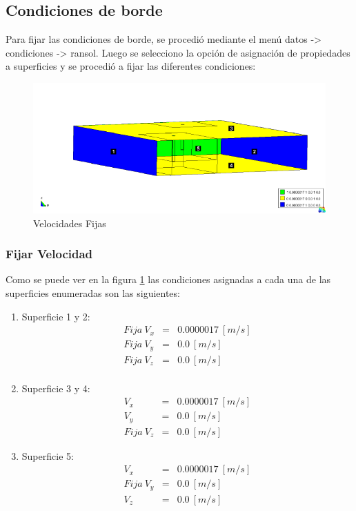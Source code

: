 \documentclass[10pt,a4paper,final]{article}
\begin{document}
%
\subsection{Condiciones de borde}
Para fijar las condiciones de borde, se procedió mediante el menú datos -> condiciones -> ransol. Luego se selecciono la opción de asignación de propiedades a superficies y se procedió a fijar las diferentes condiciones:
\begin{figure}[tbhp]
\centerline{\includegraphics[scale=0.75]{img/datos_condiciones_ransol_fijar_velocidadinterno_leyendas}}
\caption{Velocidades Fijas}
\label{datos_condiciones_ransol_fijar_velocidadinterno_leyendas}
\end{figure}
\subsubsection*{Fijar Velocidad}
Como se puede ver en la figura \ref{datos_condiciones_ransol_fijar_velocidadinterno_leyendas} las condiciones asignadas a cada una de las superficies enumeradas son las siguientes:
\begin{enumerate}
\item Superficie 1 y 2:
\begin{eqnarray*}
Fija~V_x&=&0.0000017~[m/s]\\
Fija~V_y&=&0.0~[m/s]\\
Fija~V_z&=&0.0~[m/s]\\
\end{eqnarray*}
\item Superficie 3 y 4:\begin{eqnarray*}
V_x&=&0.0000017~[m/s]\\
V_y&=&0.0~[m/s]\\
Fija~V_z&=&0.0~[m/s]
\end{eqnarray*}
\item Superficie 5:
\begin{eqnarray*}
V_x&=&0.0000017~[m/s]\\
Fija~V_y&=&0.0~[m/s]\\
V_z&=&0.0~[m/s]
\end{eqnarray*}
\end{enumerate}
\end{document}
